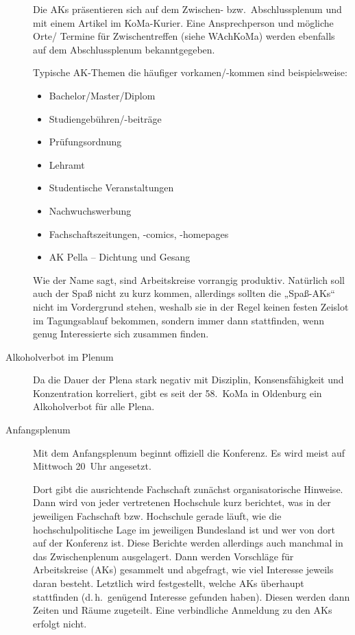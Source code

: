 \begin{description}
	Die AKs präsentieren sich auf dem Zwischen- bzw.\ Abschlussplenum und mit einem Artikel im KoMa-Kurier. Eine Ansprechperson und mögliche Orte/ Termine für Zwischentreffen (siehe WAchKoMa) werden ebenfalls auf dem Abschlussplenum bekanntgegeben.

	Typische AK-Themen die häufiger vorkamen/-kommen sind beispielsweise:
	\begin{itemize}
		\item Bachelor/Master/Diplom
		\item Studiengebühren/-beiträge
		\item Prüfungsordnung
		\item Lehramt
		\item Studentische Veranstaltungen
		\item Nachwuchswerbung
		\item Fachschaftszeitungen, -comics, -homepages
		\item AK Pella -- Dichtung und Gesang
	\end{itemize}
	Wie der Name sagt, sind Arbeitskreise vorrangig produktiv. Natürlich soll auch der Spaß nicht zu kurz kommen, allerdings sollten die „Spaß-AKs“ nicht im Vordergrund stehen, weshalb sie in der Regel keinen festen Zeislot im Tagungsablauf bekommen, sondern immer dann stattfinden, wenn genug Interessierte sich zusammen finden.

\item[Alkoholverbot im Plenum]
    Da die Dauer der Plena stark negativ mit Disziplin, Konsensfähigkeit und Konzentration korreliert, gibt es seit der 58.~KoMa in Oldenburg ein Alkoholverbot für alle Plena.

\item[Anfangsplenum]
    Mit dem Anfangsplenum beginnt offiziell die Konferenz. Es wird meist auf Mittwoch 20~Uhr angesetzt.

    Dort gibt die ausrichtende Fachschaft zunächst organisatorische Hinweise. Dann wird von jeder vertretenen Hochschule kurz berichtet, was in der jeweiligen Fachschaft bzw. Hochschule gerade läuft, wie die hochschulpolitische Lage im jeweiligen Bundesland ist und wer von dort auf der Konferenz ist. Diese Berichte werden allerdings auch manchmal in das Zwischenplenum ausgelagert. Dann werden Vorschläge für Arbeitskreise (AKs) gesammelt und abgefragt, wie viel Interesse jeweils daran besteht. Letztlich wird festgestellt, welche AKs überhaupt stattfinden (d.\,h.\ genügend Interesse gefunden haben). Diesen werden dann Zeiten und Räume zugeteilt. Eine verbindliche Anmeldung zu den AKs erfolgt nicht.


\end{description}
